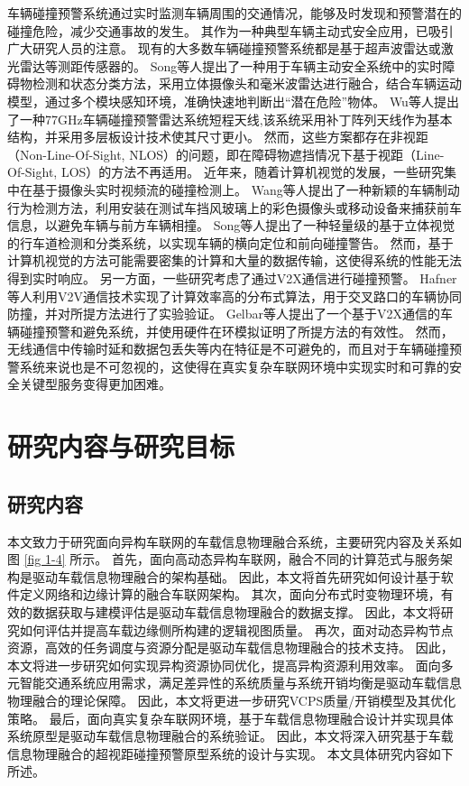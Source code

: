 车辆碰撞预警系统通过实时监测车辆周围的交通情况，能够及时发现和预警潜在的碰撞危险，减少交通事故的发生。
其作为一种典型车辆主动式安全应用，已吸引广大研究人员的注意。
现有的大多数车辆碰撞预警系统都是基于超声波雷达或激光雷达等测距传感器的。
Song等人\cite{song2018real}提出了一种用于车辆主动安全系统中的实时障碍物检测和状态分类方法，采用立体摄像头和毫米波雷达进行融合，结合车辆运动模型，通过多个模块感知环境，准确快速地判断出“潜在危险”物体。
Wu等人\cite{wu2019series}提出了一种77GHz车辆碰撞预警雷达系统短程天线,该系统采用补丁阵列天线作为基本结构，并采用多层板设计技术使其尺寸更小。
然而，这些方案都存在非视距（Non-Line-Of-Sight, NLOS）的问题，即在障碍物遮挡情况下基于视距（Line-Of-Sight, LOS）的方法不再适用。
近年来，随着计算机视觉的发展，一些研究集中在基于摄像头实时视频流的碰撞检测上。
Wang等人\cite{wang2016vision}提出了一种新颖的车辆制动行为检测方法，利用安装在测试车挡风玻璃上的彩色摄像头或移动设备来捕获前车信息，以避免车辆与前方车辆相撞。
Song等人\cite{song2018lane}提出了一种轻量级的基于立体视觉的行车道检测和分类系统，以实现车辆的横向定位和前向碰撞警告。
然而，基于计算机视觉的方法可能需要密集的计算和大量的数据传输，这使得系统的性能无法得到实时响应。 
另一方面，一些研究考虑了通过V2X通信进行碰撞预警。
Hafner等人\cite{hafner2013cooperative}利用V2V通信技术实现了计算效率高的分布式算法，用于交叉路口的车辆协同防撞，并对所提方法进行了实验验证。
Gelbar等人\cite{gelbal2017elastic}提出了一个基于V2X通信的车辆碰撞预警和避免系统，并使用硬件在环模拟证明了所提方法的有效性。
然而，无线通信中传输时延和数据包丢失等内在特征是不可避免的，而且对于车辆碰撞预警系统来说也是不可忽视的，这使得在真实复杂车联网环境中实现实时和可靠的安全关键型服务变得更加困难。

\section{研究内容与研究目标}\label{section 1-4}

\subsection{研究内容}

本文致力于研究面向异构车联网的车载信息物理融合系统，主要研究内容及关系如图 \ref{fig 1-4} 所示。
首先，面向高动态异构车联网，融合不同的计算范式与服务架构是驱动车载信息物理融合的架构基础。
因此，本文将首先研究如何设计基于软件定义网络和边缘计算的融合车联网架构。
其次，面向分布式时变物理环境，有效的数据获取与建模评估是驱动车载信息物理融合的数据支撑。
因此，本文将研究如何评估并提高车载边缘侧所构建的逻辑视图质量。
再次，面对动态异构节点资源，高效的任务调度与资源分配是驱动车载信息物理融合的技术支持。
因此，本文将进一步研究如何实现异构资源协同优化，提高异构资源利用效率。
面向多元智能交通系统应用需求，满足差异性的系统质量与系统开销均衡是驱动车载信息物理融合的理论保障。
因此，本文将更进一步研究VCPS质量/开销模型及其优化策略。
最后，面向真实复杂车联网环境，基于车载信息物理融合设计并实现具体系统原型是驱动车载信息物理融合的系统验证。
因此，本文将深入研究基于车载信息物理融合的超视距碰撞预警原型系统的设计与实现。
本文具体研究内容如下所述。

